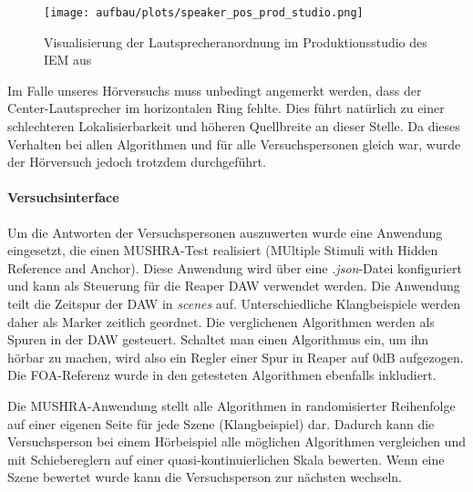 \begin{figure}[!ht]
  \centering
  \texttt{[image: aufbau/plots/speaker\_pos\_prod\_studio.png]}
  \caption{Visualisierung der Lautsprecheranordnung im Produktionsstudio des IEM aus \cite{ambi-book}}
  \label{fig:aufb:prodstud}
\end{figure}



Im Falle unseres Hörversuchs muss unbedingt angemerkt werden, dass der Center-Lautsprecher im horizontalen Ring fehlte. Dies führt natürlich zu einer schlechteren Lokalisierbarkeit und höheren Quellbreite an dieser Stelle. Da dieses Verhalten bei allen Algorithmen und für alle Versuchspersonen gleich war, wurde der Hörversuch jedoch trotzdem durchgeführt.

\paragraph{Versuchsinterface}
Um die Antworten der Versuchspersonen auszuwerten wurde eine Anwendung eingesetzt, die einen MUSHRA-Test realisiert (MUltiple Stimuli with Hidden Reference and Anchor). Diese Anwendung wird über eine \textit{.json}-Datei konfiguriert und kann als Steuerung für die Reaper DAW verwendet werden. Die Anwendung teilt die Zeitspur der DAW in \textit{scenes} auf. Unterschiedliche Klangbeispiele werden daher als Marker zeitlich geordnet. Die verglichenen Algorithmen werden als Spuren in der DAW gesteuert. Schaltet man einen Algorithmus ein, um ihn hörbar zu machen, wird also ein Regler einer Spur in Reaper auf 0dB aufgezogen. Die FOA-Referenz wurde in den getesteten Algorithmen ebenfalls inkludiert.

Die MUSHRA-Anwendung stellt alle Algorithmen in randomisierter Reihenfolge auf einer eigenen Seite für jede Szene (Klangbeispiel) dar. Dadurch kann die Versuchsperson bei einem Hörbeispiel alle möglichen Algorithmen vergleichen und mit Schiebereglern auf einer quasi-kontinuierlichen Skala bewerten. Wenn eine Szene bewertet wurde kann die Versuchsperson zur nächsten wechseln.
